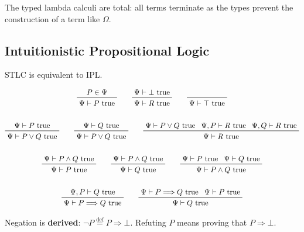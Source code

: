 \documentclass[a4paper,11pt]{article}
\begin{document}
{{        The typed lambda calculi are total: all terms terminate as the types prevent the construction of a term like
        \(\Omega\).

        \subsection*{Intuitionistic Propositional Logic}
        {
            STLC is equivalent to IPL.

            \begin{gather*}
            \prftree[r]{}
            {P\in\Psi}
            {\Psi\vdash P\text{ true}}
            \qquad
            \prftree[r]{}
            {\Psi\vdash\bot\text{ true}}
            {\Psi\vdash R\text{ true}}
            \qquad
            \prftree[r]{}
            {\Psi\vdash \top\text{ true}}
            \\
            \\
            \prftree[r]{}
            {\Psi\vdash P\text{ true}}
            {\Psi\vdash P \vee Q\text{ true}}
            \qquad
            \prftree[r]{}
            {\Psi\vdash Q\text{ true}}
            {\Psi\vdash P \vee Q\text{ true}}
            \qquad
            \prftree[r]{}
            {\Psi\vdash P \vee Q\text{ true}}
            {\Psi,P\vdash R\text{ true}}
            {\Psi,Q\vdash R\text{ true}}
            {\Psi\vdash R\text{ true}}
            \\
            \\
            \prftree[r]{}
            {\Psi\vdash P \wedge Q\text{ true}}
            {\Psi\vdash P \text{ true}}
            \qquad
            \prftree[r]{}
            {\Psi\vdash P \wedge Q\text{ true}}
            {\Psi\vdash Q \text{ true}}
            \qquad
            \prftree[r]{}
            {\Psi\vdash P \text{ true}}
            {\Psi\vdash Q \text{ true}}
            {\Psi\vdash P \wedge Q\text{ true}}
            \\
            \\
            \prftree[r]{}
            {\Psi,P\vdash Q\text{ true}}
            {\Psi\vdash P \Longrightarrow Q\text{ true}}
            \qquad
            \prftree[r]{}
            {\Psi\vdash P \Longrightarrow Q\text{ true}}
            {\Psi\vdash P\text{ true}}
            {\Psi\vdash Q\text{ true}}
            \end{gather*}

            Negation is \textbf{derived}: \(\neg P \stackrel{\text{def}}{=}P\Longrightarrow\bot\). Refuting \(P\) means
            proving that \(P\Longrightarrow\bot\).

}}}
\end{document}
